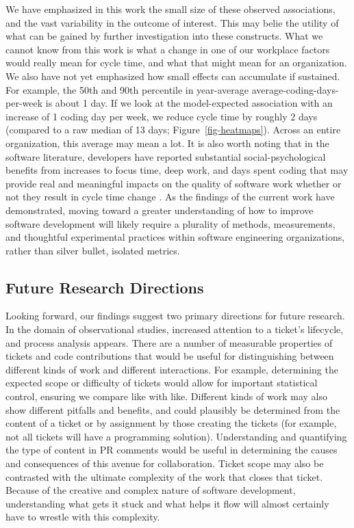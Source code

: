 \documentclass[
  sn-mathphys-ay,
]{sn-jnl}
\begin{document}
We have emphasized in this work the small size of these observed
associations, and the vast variability in the outcome of interest. This
may belie the utility of what can be gained by further investigation
into these constructs. What we cannot know from this work is what a
change in one of our workplace factors would really mean for cycle time,
and what that might mean for an organization. We also have not yet
emphasized how small effects can accumulate if sustained. For example,
the 50th and 90th percentile in year-average
average-coding-days-per-week is about 1 day. If we look at the
model-expected association with an increase of 1 coding day per week, we
reduce cycle time by roughly 2 days (compared to a raw median of 13
days; Figure~\ref{fig-heatmaps}). Across an entire organization, this
average may mean a lot. It is also worth noting that in the software
literature, developers have reported substantial social-psychological
benefits from increases to focus time, deep work, and days spent coding
that may provide real and meaningful impacts on the quality of software
work whether or not they result in cycle time change
\citep{meyerTodayWasGood2021}. As the findings of the current work have
demonstrated, moving toward a greater understanding of how to improve
software development will likely require a plurality of methods,
measurements, and thoughtful experimental practices within software
engineering organizations, rather than silver bullet, isolated metrics.

\subsection{Future Research
Directions}\label{future-research-directions}

Looking forward, our findings suggest two primary directions for future
research. In the domain of observational studies, increased attention to
a ticket's lifecycle, and process analysis appears. There are a number
of measurable properties of tickets and code contributions that would be
useful for distinguishing between different kinds of work and different
interactions. For example, determining the expected scope or difficulty
of tickets would allow for important statistical control, ensuring we
compare like with like. Different kinds of work may also show different
pitfalls and benefits, and could plausibly be determined from the
content of a ticket or by assignment by those creating the tickets (for
example, not all tickets will have a programming solution).
Understanding and quantifying the type of content in PR comments would
be useful in determining the causes and consequences of this avenue for
collaboration. Ticket scope may also be contrasted with the ultimate
complexity of the work that closes that ticket. Because of the creative
and complex nature of software development, understanding what gets it
stuck and what helps it flow will almost certainly have to wrestle with
this complexity.
\end{document}
